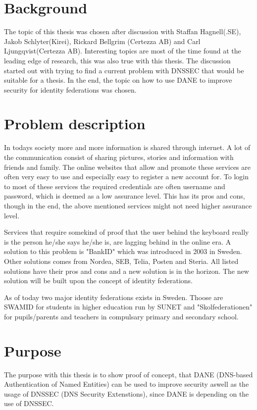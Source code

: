 \section{Background}
The topic of this thesis was chosen after discussion with Staffan Hagnell(.SE), Jakob Schlyter(Kirei), Rickard Bellgrim (Certezza AB) and Carl Ljungqvist(Certezza AB).
Interesting topics are most of the time found at the leading edge of research, this was also true with this thesis.
The discussion started out with trying to find a current problem with DNSSEC that would be suitable for a thesis.
In the end, the topic on how to use DANE to improve security for identity federations was chosen.

\section{Problem description}
In todays society more and more information is shared through internet.
A lot of the communication consist of sharing pictures, stories and information with friends and family.
The online websites that allow and promote these services are often very easy to use and especially easy to register a new account for.
To login to most of these services the required credentials are often username and password, which is deemed as a low assurance level\cite[p.~244]{pdf:SOU}.
This has its pros and cons, though in the end, the above mentioned services might not need higher assurance level.

Services that require somekind of proof that the user behind the keyboard really is the person he/she says he/she is, are lagging behind in the online era.
A solution to this problem is "BankID" which was introduced in 2003\cite{website:bankid-about} in Sweden.
Other solutions comes from Nordea, SEB, Telia, Posten and Steria\cite[p.~256]{pdf:SOU}.
All listed solutions have their pros and cons and a new solution is in the horizon.
The new solution will be built upon the concept of identity federations\cite[p.~23]{pdf:SOU}.

As of today two major identity federations exists in Sweden.
Thoose are SWAMID for students in higher education run by SUNET and "Skolfederationen" for pupils/parents and teachers in compulsary primary and secondary school.

\section{Purpose}
The purpose with this thesis is to show proof of concept, that DANE (DNS-based Authentication of Named Entities) can be used to improve security aswell as the usage of DNSSEC (DNS Security Extenstions), since DANE is depending on the use of DNSSEC.

